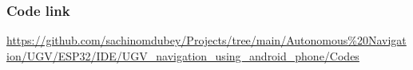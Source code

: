 \documentclass[a4paper,twoside]{iiththesis}
\begin{document}
\subsubsection{{Code link}}\label{Code_link_UGV_phone}
\begin{tcolorbox}
\url{https://github.com/sachinomdubey/Projects/tree/main/Autonomous\%20Navigation/UGV/ESP32/IDE/UGV_navigation_using_android_phone/Codes}
\end{tcolorbox}



    
\end{document}
